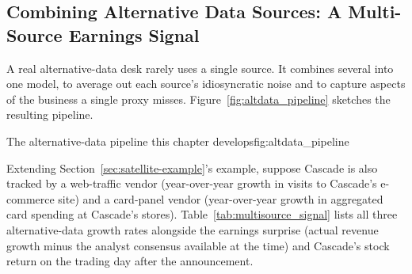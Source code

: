 \documentclass[../ai_in_finance]{subfiles}
\begin{document}
\subsection{Combining Alternative Data Sources: A Multi-Source Earnings Signal}
\label{sec:alt-data-pipeline}

A real alternative-data desk rarely uses a single source. It combines several into one model, to average out each source's idiosyncratic noise and to capture aspects of the business a single proxy misses. Figure~\ref{fig:altdata_pipeline} sketches the resulting pipeline.

\begin{bookfigure}[htbp]{The alternative-data pipeline this chapter develops}{fig:altdata_pipeline}
\end{bookfigure}

Extending Section~\ref{sec:satellite-example}'s example, suppose Cascade is also tracked by a web-traffic vendor (year-over-year growth in visits to Cascade's e-commerce site) and a card-panel vendor (year-over-year growth in aggregated card spending at Cascade's stores). Table~\ref{tab:multisource_signal} lists all three alternative-data growth rates alongside the earnings surprise (actual revenue growth minus the analyst consensus available at the time) and Cascade's stock return on the trading day after the announcement.
\end{document}
